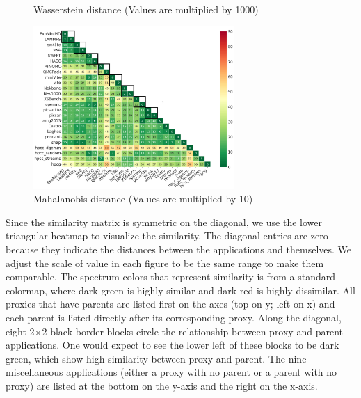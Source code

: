 \documentclass[conference]{IEEEtran}
\begin{document}
\begin{figure}[htbp]
\begin{minipage}[t]{0.48\textwidth}
	\vspace*{-5mm}
	\caption{Wasserstein distance (Values are multiplied by 1000)}
	\label{figs:Wasserstein}
	\end{minipage}
\hspace{.1in}	
\begin{minipage}[t]{0.48\textwidth}
	\centering
	\includegraphics[width=3in]{figs/Mahalanobis distance_m10.png}
	\vspace*{-5mm}
	\caption{Mahalanobis distance (Values are multiplied by 10)}
	\label{figs:Mahalanobis}
	\end{minipage}
\hspace{.1in}
\end{figure}

Since the similarity matrix is symmetric on the diagonal, we use the lower triangular heatmap to visualize the similarity. The diagonal entries are zero because they indicate the distances between the applications and themselves. We adjust the scale of value in each figure to be the same range to make them comparable. The spectrum colors that represent similarity is from a standard colormap, where dark green is highly similar and dark red is highly dissimilar. All proxies that have parents are listed first on the axes (top on y; left on x) and each parent is listed directly after its corresponding proxy. Along the diagonal, eight 2$\times$2 black border blocks circle the relationship between proxy and parent applications. One would expect to see the lower left of these blocks to be dark green, which show high similarity between proxy and parent. The nine miscellaneous applications (either a proxy with no parent or a parent with no proxy) are listed at the bottom on the y-axis and the right on the x-axis. 
\end{document}
